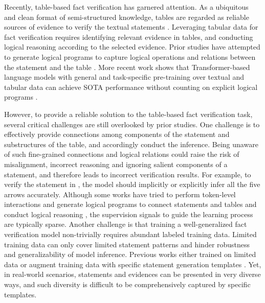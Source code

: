 \documentclass[11pt]{article}
\begin{document}
Recently, table-based fact verification \cite{chen2019tabfact, zhong2020logicalfactchecker, yang2020program} has garnered attention. 
As a ubiquitous and clean format of semi-structured knowledge, tables are regarded as reliable sources of evidence to verify the textual statements \cite{chen2019tabfact}.
Leveraging tabular data for fact verification requires identifying relevant evidence in tables,
and conducting logical reasoning according to the selected evidence.
Prior studies have attempted to 
generate logical programs to capture logical operations and relations between the statement and the table \cite{zhong2020logicalfactchecker,yang2020program, shi2020learn}.
More recent work shows that Transformer-based language models with general and task-specific pre-training over textual and tabular data can achieve SOTA performance without counting on explicit logical programs \cite{eisenschlos2020understanding, dong2021structural}.







However, to provide a reliable solution to the table-based fact verification task, several critical challenges are still overlooked by prior studies.
One challenge is to effectively provide connections among components of the statement and substructures of the table, and accordingly conduct the inference.
Being unaware of such fine-grained connections and logical relations could raise the risk of misalignment, incorrect reasoning and ignoring salient components of a statement, and therefore leads to incorrect verification results.
For example, to verify the statement in , the model should implicitly or explicitly infer all the five arrows accurately.
Although some works have tried to perform token-level interactions and generate logical programs to connect statements and tables and conduct logical reasoning \cite{zhong2020logicalfactchecker,yang2020program}, the supervision signals to guide the learning process are typically sparse. Another challenge is that training a well-generalized fact verification model non-trivially requires abundant labeled training data.
Limited training data can only cover limited statement patterns and hinder robustness and generalizability of model inference.
Previous works either trained on limited data \cite{zhong2020logicalfactchecker,yang2020program} or augment training data with specific statement generation templates \cite{eisenschlos2020understanding}.
Yet, in real-world scenarios, statements and evidences can be presented in very diverse ways, and such diversity is difficult to be comprehensively captured by specific templates.
\end{document}
